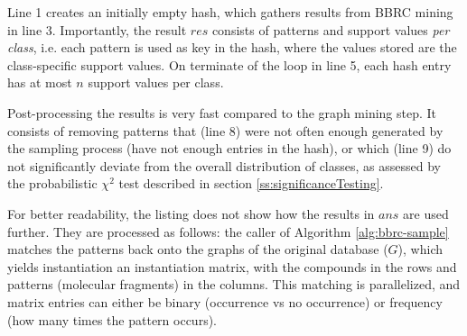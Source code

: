 \documentclass{article}
\begin{document}
Line 1 creates an initially empty hash, which gathers results from BBRC mining in line 3. Importantly, the result $res$ consists of patterns and support values \emph{per class}, i.e. each pattern is used as key in the hash, where the values stored are the class-specific support values. On terminate of the loop in line 5, each hash entry has at most $n$ support values per class.

Post-processing the results is very fast compared to the graph mining step. It consists of removing patterns that (line 8) were not often enough generated by the sampling process (have not enough entries in the hash), or which (line 9) do not significantly deviate from the overall distribution of classes, as assessed by the probabilistic $\chi^2$ test described in section \ref{ss:significanceTesting}.

For better readability, the listing does not show how the results in $ans$ are used further. They are processed as follows: the caller of Algorithm \ref{alg:bbrc-sample} matches the patterns back onto the graphs of the original database ($G$), which yields instantiation an instantiation matrix, with the compounds in the rows and patterns (molecular fragments) in the columns. This matching is parallelized, and matrix entries can either be binary (occurrence vs no occurrence) or frequency (how many times the pattern occurs).
\end{document}
